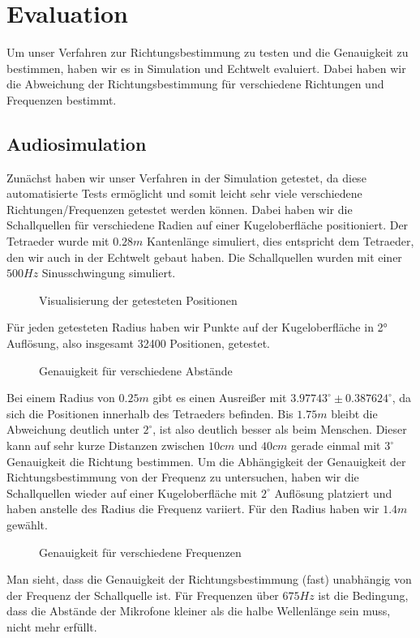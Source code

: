 \section{Evaluation}
Um unser Verfahren zur Richtungsbestimmung zu testen und die Genauigkeit zu bestimmen, haben wir es in Simulation und Echtwelt evaluiert. Dabei haben wir die Abweichung der Richtungsbestimmung für verschiedene Richtungen und Frequenzen bestimmt.
\subsection{Audiosimulation}
Zunächst haben wir unser Verfahren in der Simulation getestet, da diese automatisierte Tests ermöglicht und somit leicht sehr viele verschiedene Richtungen/Frequenzen getestet werden können. Dabei haben wir die Schallquellen für verschiedene Radien auf einer Kugeloberfläche positioniert. Der Tetraeder wurde mit $0.28m$ Kantenlänge simuliert, dies entspricht dem Tetraeder, den wir auch in der Echtwelt gebaut haben. Die Schallquellen wurden mit einer $500Hz$ Sinusschwingung simuliert.
\begin{figure}[H]
  \centering
  
  \caption{Visualisierung der getesteten Positionen}
  \label{fig:pos}
\end{figure}
Für jeden getesteten Radius haben wir Punkte auf der Kugeloberfläche in 2° Auflösung, also insgesamt 32400 Positionen, getestet.
\begin{figure}[H]
  \centering
  
  \caption{Genauigkeit für verschiedene Abstände}
  \label{fig:pos_sweep}
\end{figure}
Bei einem Radius von $0.25m$ gibt es einen Ausreißer mit $3.97743^\circ \pm 0.387624^\circ$, da sich die Positionen innerhalb des Tetraeders befinden. Bis $1.75m$ bleibt die Abweichung deutlich unter $2^\circ$, ist also deutlich besser als beim Menschen. Dieser kann auf sehr kurze Distanzen zwischen $10cm$ und $40cm$ gerade einmal mit $3^\circ$ Genauigkeit die Richtung bestimmen. \cite{middlebrooks1991sound}
Um die Abhängigkeit der Genauigkeit der Richtungsbestimmung von der Frequenz zu untersuchen, haben wir die Schallquellen wieder auf einer Kugeloberfläche mit $2^\circ$ Auflösung platziert und haben anstelle des Radius die Frequenz variiert. Für den Radius haben wir $1.4m$ gewählt.
\begin{figure}[H]
  \centering
  
  \caption{Genauigkeit für verschiedene Frequenzen}
  \label{fig:freq_seep}
\end{figure}
Man sieht, dass die Genauigkeit der Richtungsbestimmung (fast) unabhängig von der Frequenz der Schallquelle ist. Für Frequenzen über $675Hz$ ist die Bedingung, dass die Abstände der Mikrofone kleiner als die halbe Wellenlänge sein muss, nicht mehr erfüllt.
